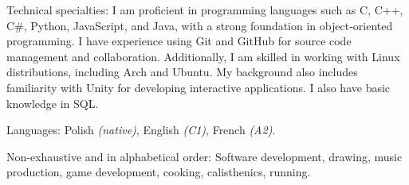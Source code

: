\documentclass[10pt,a4paper]{article} %
\begin{document}
\spacedhrule{0.8em}{-0.4em} %


\inlineheadsection %
{Technical specialties:}
{I am proficient in programming languages such as C, C++, C\#, Python, JavaScript, and Java, 
with a strong foundation in object-oriented programming. I have experience using Git and 
GitHub for source code management and collaboration. Additionally, I am skilled in working 
with Linux distributions, including Arch and Ubuntu. My background also includes 
familiarity with Unity for developing interactive applications. I also have basic knowledge in SQL.}


\inlineheadsection %
{Languages:}
{Polish \textit{(native)}, English \textit{(C1)}, French \textit{(A2)}.}


\spacedhrule{1.6em}{-0.4em} %



\inlineheadsection %
{Non-exhaustive and in alphabetical order:}
{Software development, drawing, music production, game development, cooking, calisthenics, running.}

\end{document}
